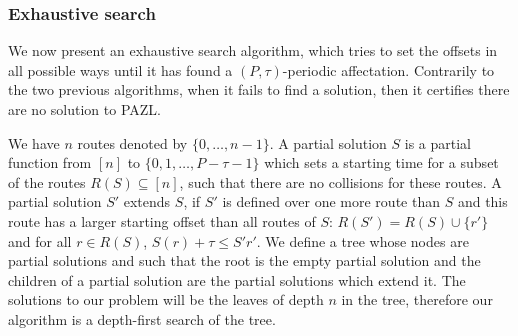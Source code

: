 \documentclass[a4paper,10pt]{article}
\begin{document}
	\subsubsection{Exhaustive search}
% 
% 

% 	    
      We now present an exhaustive search algorithm, which tries to set the offsets in all possible ways until it has found a $(P,\tau)$-periodic affectation. Contrarily to the two previous algorithms, when it fails to find a solution, then it certifies there are no solution to PAZL.
      
      We have $n$ routes denoted by $\{0,\dots,n-1\}$. A partial solution $S$ is 
      a partial function from $[n]$ to $\{0,1,\dots,P-\tau -1\}$ which sets a starting time for a subset of the routes $R(S) \subseteq [n]$, such that there are no collisions for these routes.  A partial solution $S'$ extends $S$, if $S'$ is defined over one more route than $S$ and this route has a larger starting offset than all routes of $S$: $R(S') = R(S) \cup \{r'\}$ and for all  $r \in R(S)$, $S(r) + \tau \leq S'{r'}$. We define a tree whose nodes are partial solutions and such that the root is the empty partial solution and 
      the children of a partial solution are the partial solutions which extend it. The solutions to our problem will be the leaves of depth $n$ in the tree, therefore our algorithm is a depth-first search of the tree. 
      
\end{document}
